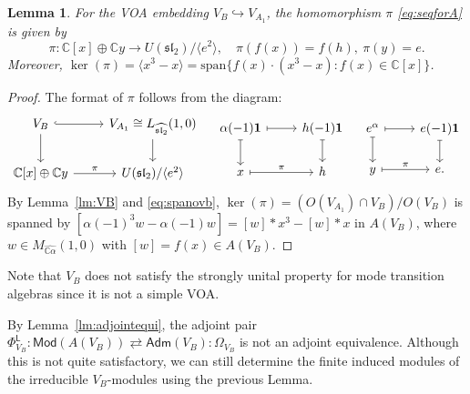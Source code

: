 \documentclass[12pt,a4paper,reqno]{amsart}
\numberwithin{equation}{section}
\numberwithin{equation}{section}
\newtheorem{lm}[thm]{Lemma}
\theoremstyle{definition}
\def \ra {\rightarrow}
\def \C {\mathbb{C}}
\def \al{\alpha}
\def\hr{\hookrightarrow}
\def \op {\oplus}
\def \vac {\mathbf{1}}
\def\L{\mathcal{L}}
\def\spn{\mathrm{span}}
\def\Om{\Omega}
\def\<{\langle}
\def\>{\rangle}
\def\L{\mathsf{L}}
\def\L{\mathsf{L}}
\def\sl{\mathfrak{sl}}
\begin{document}
	
	\begin{lm}\label{lm:VB1}
		For the VOA embedding $V_B\hr V_{A_1}$, the homomorphism $\pi$ \eqref{eq:seqforA} is given by
		\begin{equation}\label{eq:VBpi}
			\pi: \C[x]\op \C y\ra U(\sl_2)/\<e^2\>,\quad \pi (f(x))=f(h),\ \pi(y)=e.
		\end{equation}
		Moreover, $\ker(\pi)=\<x^3-x\>=\spn\{f(x)\cdot (x^3-x):f(x)\in \C[x]\}$. 
	\end{lm}
	\begin{proof}
		The format of $\pi$ follows from the diagram:
		$$
		\begin{tikzcd}
			V_B\arrow[r,hook] \arrow[d]& V_{A_1}\cong L_{\widehat{\sl_2}}(1,0)\arrow[d]\\
			\C[x]\op \C y\arrow[r,"\pi"] & U(\sl_2)/\<e^2\>
		\end{tikzcd}
		\quad 
		\begin{tikzcd}
			\al(-1)\vac \arrow[r,mapsto]\arrow[d,mapsto] & h(-1)\vac\arrow[d,mapsto]\\
			x\arrow[r,mapsto,"\pi"] & h
		\end{tikzcd}
		\quad 
		\begin{tikzcd}
			e^\al \arrow[r,mapsto]\arrow[d,mapsto] & e(-1)\vac\arrow[d,mapsto]\\
			y\arrow[r,mapsto,"\pi"] & e.
		\end{tikzcd}
		$$
		By Lemma~\ref{lm:VB} and \eqref{eq:spanovb}, $\ker(\pi)=(O(V_{A_1})\cap V_B)/O(V_B)$ is spanned by $[\al(-1)^3w-\al(-1)w]=[w]\ast x^3-[w]\ast x$ in $A(V_B)$, where $w\in M_{\widehat{\C\al}}(1,0)$ with $[w]=f(x)\in A(V_B)$.  
	\end{proof}
	
	Note that $V_B$ does not satisfy the strongly unital property for mode transition algebras since it is not a simple VOA. 
	
	By Lemma~\ref{lm:adjointequi}, the adjoint pair $\Phi_{V_B}^\L:\mathsf{Mod}(A(V_B))\rightleftarrows\mathsf{Adm}(V_B):\Om_{V_B}$ is not an adjoint equivalence. Although this is not quite satisfactory, we can still determine the finite induced modules of the irreducible $V_{B}$-modules using the previous Lemma. 
	
\end{document}
